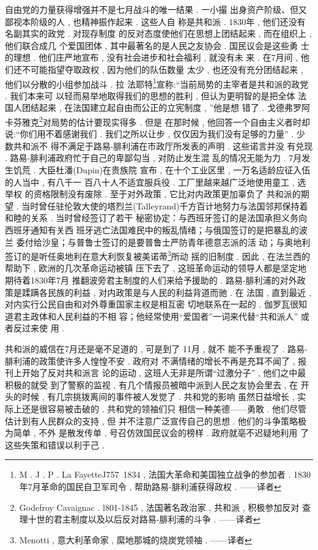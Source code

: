 自由党的力量获得增强并不是七月战斗的唯一结果 . 一小撮 出身资产阶级、但又鄙视本阶级的人 , 也精神振作起来 . 这些人自 称是共和派 . 1830年 , 他们还没有名副其实的政党 . 对现存制度 的反对态度使他们在思想上团结起来 , 而在组织上 , 他们联合成几 个爱国团体 , 其中最著名的是人民之友协会 . 国民议会是这些勇 士的理想 . 他们庄严地宣布 , 没有社会进步和社会福利 , 就没有未 来 . 在7月间 , 他们还不可能指望夺取政权 , 因为他们的队伍数量 太少 , 也还没有充分团结起来 , 他们以分散的小组参加战斗 . 拉 \textbullet  法耶特\footnote{M . J . P . La FayetteJ757~1834 , 法国大革命和美国独立战争的参加者 . 1830 年7月革命的国民自卫军司令 , 帮助路易-腓利浦获得政权 . ——译者}宣称:“当前局势的主宰者是共和派的政党 . 我们本来可 以轻而易举地取得我们的思想的胜利 , 但认为更明智的是把全体 法国人团结起来 , 在法国建立起自由而公正的立宪制度 , ”他是想 错了 . 戈德弗罗阿 \textbullet 卡芬雅克\footnote{Godefroy Cavaignac . l801-1845 , 法国著名政治家 , 共和派 , 积极参加反对 查理十世的君主制度以及以后反对路易-腓利浦的斗争 . ——译者}对局势的估计要现实得多 . 但是 在那时候 , 他回答一个自由主义者时却说:“你们用不着感谢我们 .  我们之所以让步 , 仅仅因为我们没有足够的力量” . 少数共和派不 得不满足于路易-腓利浦在市政厅所发表的声明 . 这些诺言并没 有兑现 . 路易-腓利浦政府忙于自己的卑鄙勾当 , 对防止发生混 乱的情况无能为力 . 7月发生饥荒 . 大臣杜潘(Dupin)在贵族院 宣布 , 在十个工业区里 , 一万名适龄应征入伍的人当中 , 有八千一 百八十人不适宜服兵役 . 工厂里越来越广泛地使用童工 , 选举权 的资格限制没有废除 . 至于对外政策 , 它比对内政策更加辜负了 共和派的期望 . 当时曾任驻伦敦大使的塔烈兰(Talleyrand)千方百计地努力与法国邻邦保持着和睦的关系 . 当时曾经签订了若干 秘密协定：与西班牙签订的是法国承担义务向西班牙通知有关西 班牙逃亡法国难民中的叛乱情绪；与俄国签订的是把暴乱的波兰 委付给沙皇；与普鲁士签订的是要普鲁士严防青年德意志派的活 动；与奥地利签订的是听任奥地利在意大利恢复被美诺蒂\footnote{Menotti , 意大利革命家 , 縻地那城的烧炭党领袖 . ——译者}所动 摇的旧制度 . 因此 , 在法兰西的帮助下 , 欧洲的几次革命运动被镇 压下去了 , 这班革命运动的领导人都是坚定地期待着1830年7月 推翻波旁君主制度的人们来给予援助的 . 路易-腓利浦的对外政 策是蹂蹒各民族的利益 , 对内政策是与人民的利益背道而驰 . 在 法国 , 直到最近 , 对内实行公民自由和对外尊重国家主权是相互密 切地联系在一起的 . 伽罗瓦很知道君主政体和人民利益的不相 容；他经常使用“爱国者”一词来代替“共和派人” 或者反过来使 用 . 

共和派的威信在7月还是毫不足道的 , 可是到了 11月 , 就不 能不予重视了 . 路易-腓利浦的政策使许多人惶惶不安 . 政府对 不满情绪的增长不再是充耳不闻了 , 报刊上开始了反对共和派言 论的运动 , 这班人无非是所谓“过激分子” , 他们之中最积极的就受 到了警察的监视 , 有几个情报员被暗中派到人民之友协会里去 , 在 开头的时候 , 有几宗挑拨离间的事件被人发觉了 . 共和党的影响 虽然日益增长 , 实际上还是很容易被击破的 . 共和党的领袖们只 相信一种美德——勇敢 . 他们尽管估计到有人民群众的支持 , 但 并不注意广泛宣传自己的思想 . 他们的斗争策略极为简单 , 不外 是散发传单 , 号召仿效国民议会的榜样 . 政府就亳不迟疑地利用 了这些失策和错误以利于己 . 

